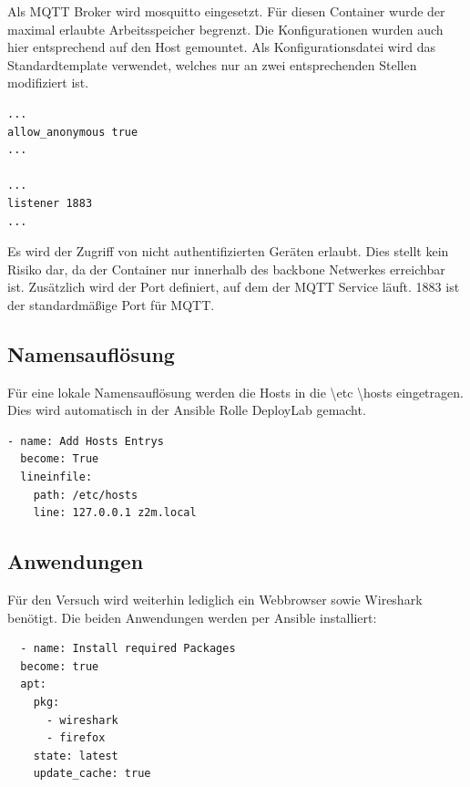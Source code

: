 Als MQTT Broker wird \grqq mosquitto \grqq{} eingesetzt. Für diesen Container wurde der maximal erlaubte Arbeitsspeicher begrenzt. Die Konfigurationen 
wurden auch hier entsprechend auf den Host gemountet. Als Konfigurationsdatei wird das Standardtemplate verwendet, welches nur an zwei 
entsprechenden Stellen modifiziert ist.

\begin{lstlisting}
... 
allow_anonymous true
... 

... 
listener 1883
... 
\end{lstlisting}

Es wird der Zugriff von nicht authentifizierten Geräten erlaubt. Dies stellt kein Risiko dar, da der Container nur innerhalb des \grqq backbone \grqq{} 
Netwerkes erreichbar ist. Zusätzlich wird der Port definiert, auf dem der MQTT Service läuft. 1883 ist der standardmäßige Port für MQTT.

\subsection{Namensauflösung}

Für eine lokale Namensauflösung werden die Hosts in die \grqq \textbackslash etc \textbackslash hosts \grqq{} eingetragen. Dies wird automatisch in der Ansible
Rolle \grqq DeployLab \grqq{} gemacht.

\begin{lstlisting}
- name: Add Hosts Entrys
  become: True
  lineinfile:
    path: /etc/hosts
    line: 127.0.0.1 z2m.local
\end{lstlisting}

\subsection{Anwendungen}

Für den Versuch wird weiterhin lediglich ein Webbrowser sowie Wireshark benötigt. Die beiden Anwendungen werden per Ansible installiert:
\begin{lstlisting}
  - name: Install required Packages
  become: true
  apt:
    pkg:
      - wireshark
      - firefox
    state: latest
    update_cache: true
\end{lstlisting}

